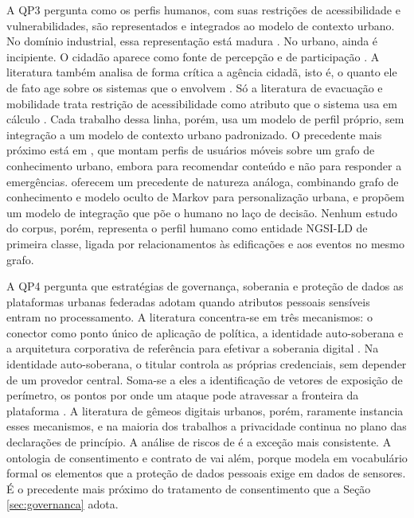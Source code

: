 A QP3 pergunta como os perfis humanos, com suas restrições de acessibilidade e vulnerabilidades, são representados e integrados ao modelo de contexto urbano. No domínio industrial, essa representação está madura \cite{asad2023human,okegbile2022edge}. No urbano, ainda é incipiente. O cidadão aparece como fonte de percepção e de participação \cite{luo2025perception,qanazi2025integrating}. A literatura também analisa de forma crítica a agência cidadã, isto é, o quanto ele de fato age sobre os sistemas que o envolvem \cite{tappert2024citizen,dejaeger2026right}. Só a literatura de evacuação e mobilidade trata restrição de acessibilidade como atributo que o sistema usa em cálculo \cite{hashemi2018emergency,deng2022semantic,allahbakhshi2026zuriact,wins2024enhancing}. Cada trabalho dessa linha, porém, usa um modelo de perfil próprio, sem integração a um modelo de contexto urbano padronizado. O precedente mais próximo está em , que montam perfis de usuários móveis sobre um grafo de conhecimento urbano, embora para recomendar conteúdo e não para responder a emergências.  oferecem um precedente de natureza análoga, combinando grafo de conhecimento e modelo oculto de Markov para personalização urbana, e  propõem um modelo de integração que põe o humano no laço de decisão. Nenhum estudo do corpus, porém, representa o perfil humano como entidade NGSI-LD de primeira classe, ligada por relacionamentos às edificações e aos eventos no mesmo grafo.

A QP4 pergunta que estratégias de governança, soberania e proteção de dados as plataformas urbanas federadas adotam quando atributos pessoais sensíveis entram no processamento. A literatura concentra-se em três mecanismos: o conector como ponto único de aplicação de política, a identidade auto-soberana e a arquitetura corporativa de referência para efetivar a soberania digital \cite{idsa2022ram,gaiax2022architecture,sanchezserna2026data,firdausy2022towards}. Na identidade auto-soberana, o titular controla as próprias credenciais, sem depender de um provedor central. Soma-se a eles a identificação de vetores de exposição de perímetro, os pontos por onde um ataque pode atravessar a fronteira da plataforma \cite{perata2023security}. A literatura de gêmeos digitais urbanos, porém, raramente instancia esses mecanismos, e na maioria dos trabalhos a privacidade continua no plano das declarações de princípio. A análise de riscos de  é a exceção mais consistente. A ontologia de consentimento e contrato de  vai além, porque modela em vocabulário formal os elementos que a proteção de dados pessoais exige em dados de sensores. É o precedente mais próximo do tratamento de consentimento que a Seção \ref{sec:governanca} adota.

